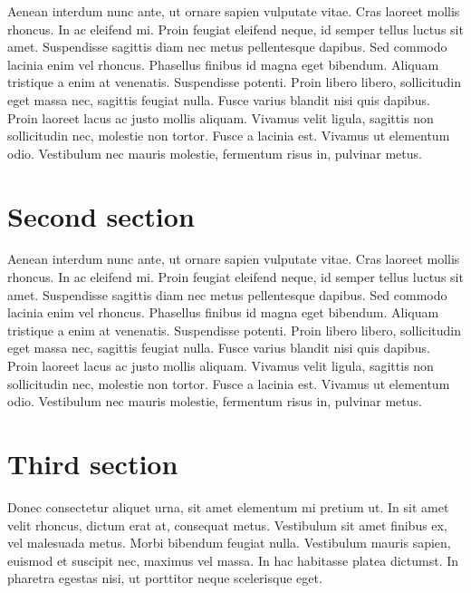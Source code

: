 \documentclass[10pt,a4paper,twoside,twocolumn]{article}
\begin{document}
Aenean interdum nunc ante, ut ornare sapien vulputate vitae. Cras laoreet mollis rhoncus. In ac eleifend mi. Proin feugiat eleifend neque, id semper tellus luctus sit amet. Suspendisse sagittis diam nec metus pellentesque dapibus. Sed commodo lacinia enim vel rhoncus. Phasellus finibus id magna eget bibendum. Aliquam tristique a enim at venenatis. Suspendisse potenti. Proin libero libero, sollicitudin eget massa nec, sagittis feugiat nulla. Fusce varius blandit nisi quis dapibus. Proin laoreet lacus ac justo mollis aliquam. Vivamus velit ligula, sagittis non sollicitudin nec, molestie non tortor. Fusce a lacinia est. Vivamus ut elementum odio. Vestibulum nec mauris molestie, fermentum risus in, pulvinar metus.

\section{Second section}

Aenean interdum nunc ante, ut ornare sapien vulputate vitae. Cras laoreet mollis rhoncus. In ac eleifend mi. Proin feugiat eleifend neque, id semper tellus luctus sit amet. Suspendisse sagittis diam nec metus pellentesque dapibus. Sed commodo lacinia enim vel rhoncus. Phasellus finibus id magna eget bibendum. Aliquam tristique a enim at venenatis. Suspendisse potenti. Proin libero libero, sollicitudin eget massa nec, sagittis feugiat nulla. Fusce varius blandit nisi quis dapibus. Proin laoreet lacus ac justo mollis aliquam. Vivamus velit ligula, sagittis non sollicitudin nec, molestie non tortor. Fusce a lacinia est. Vivamus ut elementum odio. Vestibulum nec mauris molestie, fermentum risus in, pulvinar metus.

% 

\section{Third section}

Donec consectetur aliquet urna, sit amet elementum mi pretium ut. In sit amet velit rhoncus, dictum erat at, consequat metus. Vestibulum sit amet finibus ex, vel malesuada metus. Morbi bibendum feugiat nulla. Vestibulum mauris sapien, euismod et suscipit nec, maximus vel massa. In hac habitasse platea dictumst. In pharetra egestas nisi, ut porttitor neque scelerisque eget.
\end{document}
